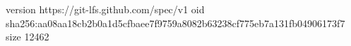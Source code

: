 version https://git-lfs.github.com/spec/v1
oid sha256:aa08aa18cb2b0a1d5cfbaee7f9759a8082b63238cf775eb7a131fb04906173f7
size 12462
